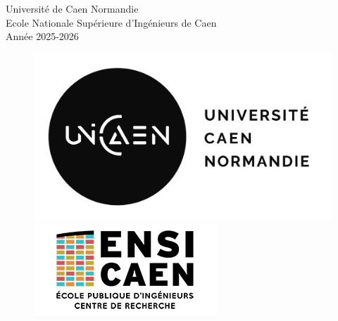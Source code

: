 \documentclass[12pt, a4paper]{article}
\begin{document}
\begin{titlepage}
    \vspace{2cm}
    {\large Université de Caen Normandie \\ Ecole Nationale Supérieure d'Ingénieurs de Caen \\ Année 2025-2026\par}
    \begin{figure}[h!]
        \centering
        \begin{minipage}{0.35\textwidth}
            \centering
             \includegraphics[width=\linewidth]{Images/Others/logo_unicaen.png}
        \end{minipage}
        \hfill %
        \begin{minipage}{0.35\textwidth}
            \centering
            \includegraphics[width=\linewidth]{Images/Others/logo_ensicaen.png}
        \end{minipage}
    \end{figure}
    


\end{titlepage}
\clearpage
\thispagestyle{empty}
\null
\clearpage
\end{document}
